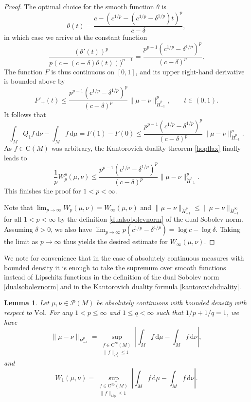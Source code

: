 \documentclass[11pt,a4paper]{article}
\newtheorem{lem}[thm]{Lemma}
\theoremstyle{definition}
\begin{document}
\begin{proof}
The optimal choice for the smooth function $\theta$ is
\[ \theta (t) = \frac{c-(c^{1/p}-(c^{1/p}-\delta^{1/p})t)^p}{c-\delta}, \]
in which case we arrive at the constant function
\[ \frac{(\theta'(t))^p}{p(c-(c-\delta)\theta(t)))^{p-1}} = \frac{p^{p-1} (c^{1/p}-\delta^{1/p})^{p}}{(c-\delta)^p} . \]
The function $F$ is thus continuous on $[0,1]$, and its upper right-hand derivative is bounded above by
\[ F'_+ (t) \le \frac{p^{p-1} (c^{1/p}-\delta^{1/p})^{p}}{(c-\delta)^p} \| \mu - \nu \|_{\dot{H}_{-1}^p}^p , \qquad t \in (0,1). \]
It follows that
\[ \int_M Q_1 f \, \mathrm{d} \nu - \int_M f \, \mathrm{d}\mu = F(1)-F(0) \le \frac{p^{p-1} (c^{1/p}-\delta^{1/p})^{p}}{(c-\delta)^p} \| \mu - \nu \|_{\dot{H}_{-1}^p}^p . \]
As $f \in \mathrm{C}(M)$ was arbitrary, the Kantorovich duality theorem \eqref{hopflax} finally leads to
\[ \frac{1}{p} W_p^p (\mu, \nu) \le \frac{p^{p-1} (c^{1/p}-\delta^{1/p})^{p}}{(c-\delta)^p} \| \mu - \nu \|_{\dot{H}_{-1}^p}^p . \]
This finishes the proof for $1<p<\infty$.

Note that $\lim_{p \to \infty} W_p (\mu, \nu) = W_{\infty}(\mu, \nu)$ and $\| \mu - \nu \|_{\dot{H}_{-1}^p} \le \| \mu - \nu \|_{\dot{H}_{-1}^{\infty}}$ for all $1<p<\infty$ by the definition \eqref{dualsobolevnorm} of the dual Sobolev norm. Assuming $\delta>0$, we also have $\lim_{p \to \infty} p(c^{1/p} - \delta^{1/p}) = \log c - \log \delta$. Taking the limit as $p \to \infty$ thus yields the desired estimate for $W_{\infty} (\mu, \nu)$.
\end{proof}

We note for convenience that in the case of absolutely continuous measures with bounded density it is enough to take the supremum over smooth functions instead of Lipschitz functions in the definition of the dual Sobolev norm \eqref{dualsobolevnorm} and in the Kantorovich duality formula \eqref{kantorovichduality}.
\begin{lem}\label{dualsobolevnormlemma} Let $\mu, \nu \in \mathcal{P}(M)$ be absolutely continuous with bounded density with respect to $\mathrm{Vol}$. For any $1< p \le \infty$ and $1 \le q < \infty$ such that $1/p+1/q=1$, we have
\[ \| \mu - \nu \|_{\dot{H}_{-1}^p} = \sup_{\substack{f \in \mathrm{C}^{\infty}(M) \\ \| f \|_{\dot{H}_1^q} \le 1}} \left| \int_M f \, \mathrm{d} \mu - \int_M f \, \mathrm{d} \nu \right| , \]
and
\[ W_1 (\mu, \nu) = \sup_{\substack{f \in \mathrm{C}^{\infty}(M) \\ \| f \|_{\mathrm{Lip}} \le 1}} \left| \int_M f \, \mathrm{d}\mu - \int_M f \, \mathrm{d}\nu \right| . \]
\end{lem}
\end{document}
